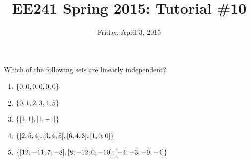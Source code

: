 \documentclass{tutorial}
\begin{document}
\newif\ifsolns


\title{EE241 Spring 2015: Tutorial \#10}
\date{Friday, April 3, 2015}
\maketitle

\begin{prob}
Which of the following sets are linearly independent?
\begin{enumerate}[label=(\alph*)]
\item $\left\{ 0, 0, 0, 0, 0, 0 \right\}$
\item $\left\{ 0, 1, 2, 3, 4, 5 \right\}$
\item $\left\{ [1,1], [1,-1] \right\}$
\item $\left\{ [2,5,4], [3,4,5], [6,4,3], [1,0,0] \right\}$
\item $\left\{ [12,-11,7,-8], [8,-12,0,-10], [-4,-3,-9,-4] \right\}$
\end{enumerate}
\end{prob} \ifsolns \begin{proof}
Recall the definition of linear independence: There is no non-trivial linear combination of the $\vec{v}_1 \dots \vec{v}_k$ that yields the zero vector. In other words, there are \emph{no} non-zero $c_1, \dots, c_k$ such that
\[
  c_1 \vec{v}_1 + \dots c_k \vec{v}_k = 0
\]
\begin{enumerate}[label=(\alph*)]
\item This set is \textbf{linearly dependent} since \emph{every} choice of linear combination yields $0$.
\item This set is \textbf{linearly dependent} since $1 \cdot 1 + (-1/2) \cdot 2 = 0$ 
\item For only two vectors it is always each to check that no $c_1, c_2$ exist such that
\[
  c_1 [1,1] = -c_2 [1,-1]
\]
\item For multiple and higher-dimensional vectors, it is best to cast the question as a matrix problem. Let $\vec{c} = [c_1, \dots, c_k]$, let also $A$ be the matrix formed by using $\vec{v}_1, \dots, \vec{v}_k$ as its columns, then if there exists a non-zero $\vec{c}$ such that $A \vec{c} = \vec{0}$, the set is linearly dependent. In other words, the set is linearly dependent if 
\item $\lb [12,-11,7,-8], [8,-12,0-10], [-4,-3,-9,-4] \rb$
\end{enumerate}
\end{proof}\else \vspace{3in} \fi
\end{document}
